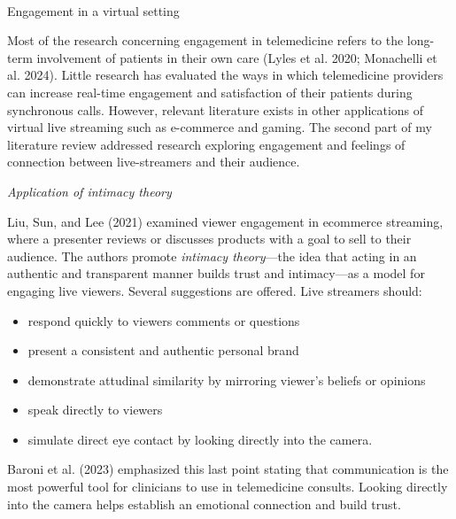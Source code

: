 \documentclass[
  letterpaper,
  DIV=11,
  numbers=noendperiod,
  oneside]{scrartcl}
\makeatletter
\let\oldparagraph\paragraph
\renewcommand{\paragraph}{
    \@ifstar
      \xxxParagraphStar
      \xxxParagraphNoStar
  }
\newcommand{\xxxParagraphStar}[1]{\oldparagraph*{#1}\mbox{}}
\newcommand{\xxxParagraphNoStar}[1]{\oldparagraph{#1}\mbox{}}
\makeatother
\begin{document}
\paragraph{Engagement in a virtual
setting}\label{engagement-in-a-virtual-setting}

Most of the research concerning engagement in telemedicine refers to the
long-term involvement of patients in their own care (Lyles et al. 2020;
Monachelli et al. 2024). Little research has evaluated the ways in which
telemedicine providers can increase real-time engagement and
satisfaction of their patients during synchronous calls. However,
relevant literature exists in other applications of virtual live
streaming such as e-commerce and gaming. The second part of my
literature review addressed research exploring engagement and feelings
of connection between live-streamers and their audience.

\emph{Application of intimacy theory}

Liu, Sun, and Lee (2021) examined viewer engagement in ecommerce
streaming, where a presenter reviews or discusses products with a goal
to sell to their audience. The authors promote \emph{intimacy
theory}---the idea that acting in an authentic and transparent manner
builds trust and intimacy---as a model for engaging live viewers.
Several suggestions are offered. Live streamers should:

\begin{itemize}
\item
  respond quickly to viewers comments or questions
\item
  present a consistent and authentic personal brand
\item
  demonstrate attudinal similarity by mirroring viewer's beliefs or
  opinions
\item
  speak directly to viewers
\item
  simulate direct eye contact by looking directly into the camera.
\end{itemize}

Baroni et al. (2023) emphasized this last point stating that
communication is the most powerful tool for clinicians to use in
telemedicine consults. Looking directly into the camera helps establish
an emotional connection and build trust.
\end{document}
